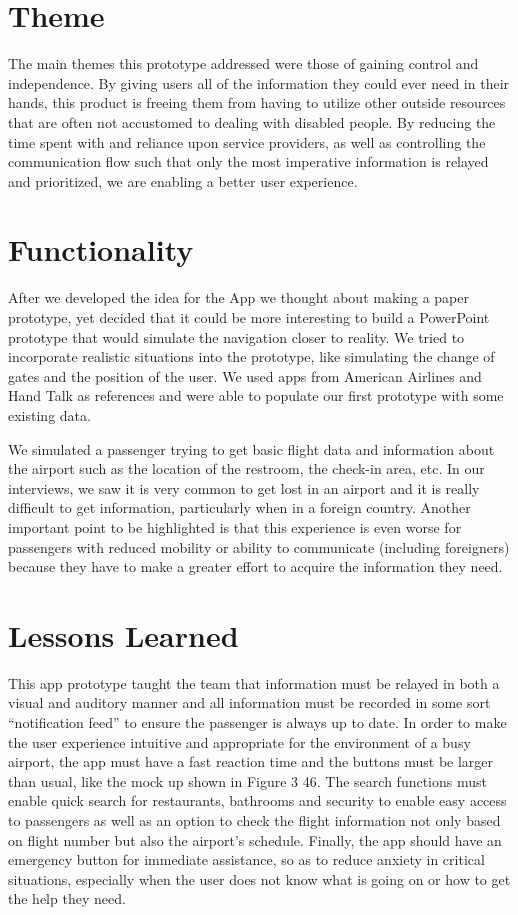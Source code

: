 \documentclass[a4paper, 12pt,conference]{new_cit_thesis}
\begin{document}
\section*{Theme}
The main themes this prototype addressed were those of gaining control and independence. By giving users all of the information they could ever need in their hands, this product is freeing them from having to utilize other outside resources that are often not accustomed to dealing with disabled people. By reducing the time spent with and reliance upon service providers, as well as controlling the communication flow such that only the most imperative information is relayed and prioritized, we are enabling a better user experience.

\section*{Functionality}
After we developed the idea for the App we thought about making a paper prototype, yet decided that it could be more interesting to build a PowerPoint prototype that would simulate the navigation closer to reality. We tried to incorporate realistic situations into the prototype, like simulating the change of gates and the position of the user. We used apps from American Airlines and Hand Talk as references and were able to populate our first prototype with some existing data.

We simulated a passenger trying to get basic flight data and information about the airport such as the location of the restroom, the check-in area, etc. In our interviews, we saw it is very common to get lost in an airport and it is really difficult to get information, particularly when in a foreign country. Another important point to be highlighted is that this experience is even worse for passengers with reduced mobility or ability to communicate (including foreigners) because they have to make a greater effort to acquire the information they need.

\section*{Lessons Learned}
This app prototype taught the team that information must be relayed in both a visual and auditory manner and all information must be recorded in some sort “notification feed” to ensure the passenger is always up to date. In order to make the user experience intuitive and appropriate for the environment of a busy airport, the app must have a fast reaction time and the buttons must be larger than usual, like the mock up shown in Figure 3 46. The search functions must enable quick search for restaurants, bathrooms and security to enable easy access to passengers as well as an option to check the flight information not only based on flight number but also the airport’s schedule.  Finally, the app should have an emergency button for immediate assistance, so as to reduce anxiety in critical situations, especially when the user does not know what is going on or how to get the help they need.
\end{document}
